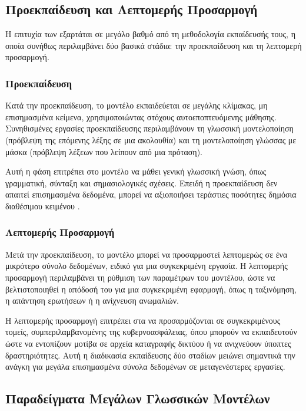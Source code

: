 \subsection{Προεκπαίδευση και Λεπτομερής Προσαρμογή}

Η επιτυχία των  εξαρτάται σε μεγάλο βαθμό από τη μεθοδολογία εκπαίδευσής τους, η οποία συνήθως περιλαμβάνει δύο βασικά στάδια: την προεκπαίδευση και τη λεπτομερή προσαρμογή.

\subsubsection{Προεκπαίδευση}

Κατά την προεκπαίδευση, το μοντέλο εκπαιδεύεται σε μεγάλης κλίμακας, μη επισημασμένα κείμενα, χρησιμοποιώντας στόχους αυτοεποπτευόμενης μάθησης. Συνηθισμένες εργασίες προεκπαίδευσης περιλαμβάνουν τη γλωσσική μοντελοποίηση (πρόβλεψη της επόμενης λέξης σε μια ακολουθία) και τη μοντελοποίηση γλώσσας με μάσκα (πρόβλεψη λέξεων που λείπουν από μια πρόταση).

Αυτή η φάση επιτρέπει στο μοντέλο να μάθει γενική γλωσσική γνώση, όπως γραμματική, σύνταξη και σημασιολογικές σχέσεις. Επειδή η προεκπαίδευση δεν απαιτεί επισημασμένα δεδομένα, μπορεί να αξιοποιήσει τεράστιες ποσότητες δημόσια διαθέσιμου κειμένου \cite{devlin2019bert}.

\subsubsection{Λεπτομερής Προσαρμογή}

Μετά την προεκπαίδευση, το μοντέλο μπορεί να προσαρμοστεί λεπτομερώς σε ένα μικρότερο σύνολο δεδομένων, ειδικό για μια συγκεκριμένη εργασία. Η λεπτομερής προσαρμογή περιλαμβάνει τη ρύθμιση των παραμέτρων του μοντέλου, ώστε να βελτιστοποιηθεί η απόδοσή του για μια συγκεκριμένη εφαρμογή, όπως η ταξινόμηση, η απάντηση ερωτήσεων ή η ανίχνευση ανωμαλιών.

Η λεπτομερής προσαρμογή επιτρέπει στα  να προσαρμόζονται σε συγκεκριμένους τομείς, συμπεριλαμβανομένης της κυβερνοασφάλειας, όπου μπορούν να εκπαιδευτούν ώστε να εντοπίζουν μοτίβα σε αρχεία καταγραφής δικτύου ή να ανιχνεύουν ύποπτες δραστηριότητες. Αυτή η διαδικασία εκπαίδευσης δύο σταδίων μειώνει σημαντικά την ανάγκη για μεγάλα επισημασμένα σύνολα δεδομένων σε μεταγενέστερες εργασίες.

\subsection{Παραδείγματα Μεγάλων Γλωσσικών Μοντέλων}

